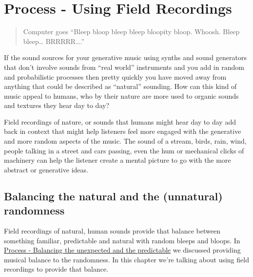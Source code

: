 \documentclass[
  12pt,
  letterpaper,
  oneside,
  open=any]{scrbook}
\begin{document}

\chapter{Process - Using Field
Recordings}\label{Chapter-019-Process-Using_Field_Recordings}

\begin{quote}
Computer goes ``Bleep bloop bleep bleep bloopity bloop. Whoosh. Bleep
bleep\ldots{} BRRRRR\ldots.''
\end{quote}

If the sound sources for your generative music using synths and sound
generators that don't involve sounds from ``real world'' instruments and
you add in random and probabilistic processes then pretty quickly you
have moved away from anything that could be described as ``natural''
sounding. How can this kind of music appeal to humans, who by their
nature are more used to organic sounds and textures they hear day to
day?

\begin{tcolorbox}[enhanced jigsaw, titlerule=0mm, toprule=.15mm, bottomrule=.15mm, colframe=quarto-callout-tip-color-frame, bottomtitle=1mm, opacityback=0, breakable, leftrule=.75mm, coltitle=black, colback=white, rightrule=.15mm, arc=.35mm, toptitle=1mm, title=\textcolor{quarto-callout-tip-color}{\faLightbulb}\hspace{0.5em}{Key idea}, opacitybacktitle=0.6, left=2mm, colbacktitle=quarto-callout-tip-color!10!white]

Field recordings of nature, or sounds that humans might hear day to day
add back in context that might help listeners feel more engaged with the
generative and more random aspects of the music. The sound of a stream,
birds, rain, wind, people talking in a street and cars passing, even the
hum or mechanical clicks of machinery can help the listener create a
mental picture to go with the more abstract or generative ideas.

\end{tcolorbox}

\section{Balancing the natural and the (unnatural)
randomness}\label{balancing-the-natural-and-the-unnatural-randomness}

Field recordings of natural, human sounds provide that balance between
something familiar, predictable and natural with random bleeps and
bloops. In
\hyperref[Chapter-009-Process-Balance_unexpected_and_predictable]{Process
- Balancing the unexpected and the predictable} we discussed providing
musical balance to the randomness. In this chapter we're talking about
using field recordings to provide that balance.
\end{document}
